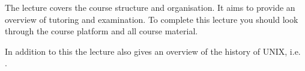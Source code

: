 The lecture covers the course structure and organisation.
It aims to provide an overview of tutoring and examination.
To complete this lecture you should look through the course platform and all 
course material.

In addition to this the lecture also gives an overview of the history of UNIX, 
i.e.\  \cite{BellLabs2002tco}.
